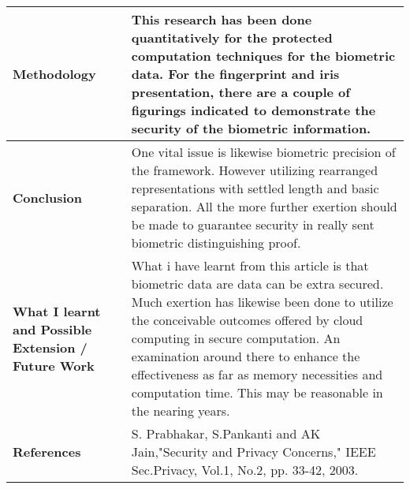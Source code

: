 \documentclass{report}
\begin{document}
\begin{tabular}{ |p{4cm}|p{6cm}| }
\hline
\textbf {\large Methodology} & {\large This research has been done quantitatively for the protected computation techniques for the biometric data. For the fingerprint and iris presentation, there are a couple of figurings indicated to demonstrate the security of the biometric information. }   \\
\hline
\textbf {\large Conclusion} & {\large One vital issue is likewise biometric precision of the framework. However utilizing rearranged representations with settled length and basic separation. All the more further exertion should be made to guarantee security in really sent biometric distinguishing proof.} \\
\hline
\textbf {\large What I learnt and Possible Extension / Future Work} & {\large What i have learnt from this article is that biometric data are data can be extra secured. Much exertion has likewise been done to utilize the conceivable outcomes offered by cloud computing in secure computation. An examination around there to enhance the effectiveness as far as memory necessities and computation time. This may be reasonable in the nearing years. } \\
\hline
\textbf {\large References} & {\large S. Prabhakar, S.Pankanti and AK Jain,"Security and Privacy Concerns," IEEE Sec.Privacy, Vol.1, No.2, pp. 33-42, 2003.} \\
\hline
\end{tabular}
\end{document}
